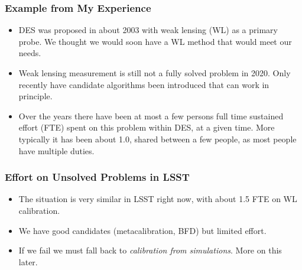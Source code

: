 \documentclass{beamer}
\begin{document}
\frame
{
    \frametitle{Example from My Experience}


    \begin{itemize}

        \item DES was proposed in about 2003 with weak lensing (WL) as a primary
            probe.  We thought we would soon have a WL method that
            would meet our needs.

        \item Weak lensing measurement is still not a fully solved problem in
            2020.  Only recently have candidate algorithms been introduced that
            can work in principle.


        \item  Over the years there have been at most a few persons full time
            sustained effort (FTE) spent on this problem within DES, at a given
            time.  More typically it has been about 1.0, shared between a few
            people, as most people have multiple duties.


    \end{itemize}

}
\frame
{
    \frametitle{Effort on Unsolved Problems in LSST}


    \begin{itemize}

        \item The situation is very similar in LSST right now, with about 1.5
            FTE on WL calibration.

        \item We have good candidates (metacalibration, BFD) but limited effort.

        \item If we fail we must fall back to {\em calibration from simulations}.  More
            on this later.

    \end{itemize}

}
\end{document}
